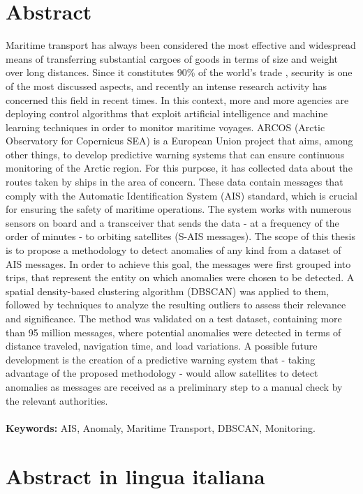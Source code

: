 \documentclass{Configuration_Files/PoliMi3i_thesis}
\begin{document}
\chapter*{Abstract} 
Maritime transport has always been considered the most effective and widespread means of transferring substantial cargoes of goods in terms of size and weight over long distances. Since it constitutes 90\% of the world's trade \cite{trasporto-marittimo}, security is one of the most discussed aspects, and recently an intense research activity has concerned this field in recent times. 
In this context, more and more agencies are deploying control algorithms that exploit artificial intelligence and machine learning techniques in order to monitor maritime voyages. ARCOS (Arctic Observatory for Copernicus SEA) is a European Union project that aims, among other things, to develop predictive warning systems that can ensure continuous monitoring of the Arctic region. For this purpose, it has collected data about the routes taken by ships in the area of concern. These data contain messages that comply with the Automatic Identification System (AIS) standard, which is crucial for ensuring the safety of maritime operations. The system works with numerous sensors on board and a transceiver that sends the data - at a frequency of the order of minutes - to orbiting satellites (S-AIS messages). The scope of this thesis is to propose a methodology to detect anomalies of any kind from a dataset of AIS messages. In order to achieve this goal, the messages were first grouped into trips, that represent the entity on which anomalies were chosen to be detected. A spatial density-based clustering algorithm (DBSCAN) was applied to them, followed by techniques to analyze the resulting outliers to assess their relevance and significance. The method was validated on a test dataset, containing more than 95 million messages, where potential anomalies were detected in terms of distance traveled, navigation time, and load variations. A possible future development is the creation of a predictive warning system that - taking advantage of the proposed methodology - would allow satellites to detect anomalies as messages are received as a preliminary step to a manual check by the relevant authorities.
\\
\\
\textbf{Keywords:} AIS, Anomaly, Maritime Transport, DBSCAN, Monitoring.

\chapter*{Abstract in lingua italiana}
\end{document}
